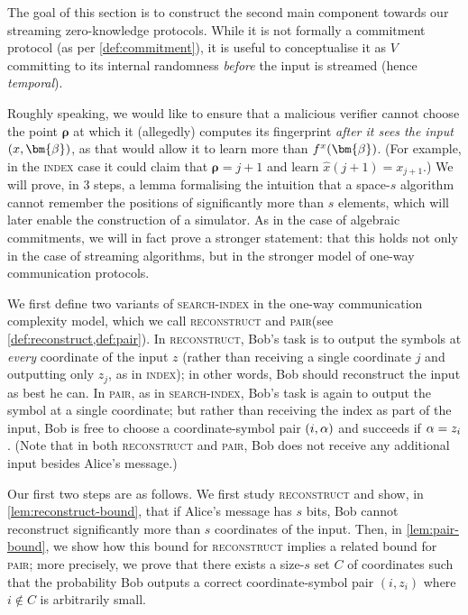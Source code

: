 \documentclass[10pt,a4paper]{article}
\theoremstyle{definition}
\newcommand{\indexproblem}{\normalfont\textsc{index}\xspace}
\newcommand{\searchindex}{\normalfont\textsc{search-index}\xspace}
\newcommand{\pair}{\normalfont\textsc{pair}\xspace}
\newcommand{\reconstruct}{\normalfont\textsc{reconstruct}\xspace}
\newcommand{\vcommitstring}{z}
\newcommand{\evaluationpoint}{\bm{\fe2}}
\newcommand{\fingerprinttuple}{\bm{\rho}}
\def\fe#1{
    \ifnum#1=1
        \alpha
    \else
    \ifnum#1=2
        \beta
    \else
    \ifnum#1=3
        \gamma
    \fi\fi\fi
}
\begin{document}
The goal of this section is to construct the second main component towards our streaming zero-knowledge protocols. While it is not formally a commitment protocol (as per \cref{def:commitment}), it is useful to conceptualise it as $V$ committing to its internal randomness \emph{before} the input is streamed (hence \emph{temporal}). 

Roughly speaking, we would like to ensure that a malicious verifier cannot choose the point $\fingerprinttuple$ at which it (allegedly) computes its fingerprint \emph{after it sees the input $(x, \evaluationpoint)$}, as that would allow it to learn more than $f^x(\evaluationpoint)$. (For example, in the \indexproblem case it could claim that $\fingerprinttuple = j + 1$ and learn $\hat x(j+1) = x_{j+1}$.) We will prove, in 3 steps, a lemma formalising the intuition that a space-$s$ algorithm cannot remember the positions of significantly more than $s$ elements, which will later enable the construction of a simulator. As in the case of algebraic commitments, we will in fact prove a stronger statement: that this holds not only in the case of streaming algorithms, but in the stronger model of one-way communication protocols.

We first define two variants of \searchindex in the one-way communication complexity model, which we call \reconstruct and \pair (see \cref{def:reconstruct,def:pair}). In \reconstruct, Bob's task is to output the symbols at \emph{every} coordinate of the input $\vcommitstring$ (rather than receiving a single coordinate $j$ and outputting only $\vcommitstring_j$, as in \indexproblem); in other words, Bob should reconstruct the input as best he can. In \pair, as in \searchindex, Bob's task is again to output the symbol at a single coordinate; but rather than receiving the index as part of the input, Bob is free to choose a coordinate-symbol pair $(i, \fe1)$ and succeeds if $\fe1 = \vcommitstring_i$. (Note that in both \reconstruct and \pair, Bob does not receive any additional input besides Alice's message.)

Our first two steps are as follows. We first study \reconstruct and show, in \cref{lem:reconstruct-bound}, that if Alice's message has $s$ bits, Bob cannot reconstruct significantly more than $s$ coordinates of the input. Then, in \cref{lem:pair-bound}, we show how this bound for \reconstruct implies a related bound for \pair; more precisely, we prove that there exists a size-$s$ set $C$ of coordinates such that the probability Bob outputs a correct coordinate-symbol pair $(i, \vcommitstring_i)$ where $i \notin C$ is arbitrarily small.
\end{document}
